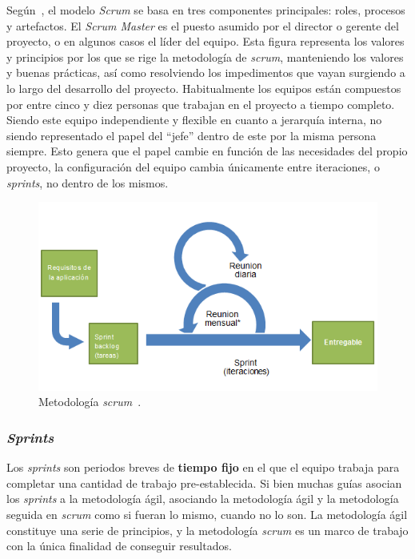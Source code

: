 Según~\cite{cervone2011understanding}, el modelo \textit{Scrum} se basa en tres componentes principales: roles, procesos y artefactos. El \textit{Scrum Master} es el puesto asumido por el director o gerente del proyecto, o en algunos casos el líder del equipo. Esta figura representa los valores y principios por los que se rige la metodología de \textit{scrum}, manteniendo los valores y buenas prácticas, así como resolviendo los impedimentos que vayan surgiendo a lo largo del desarrollo del proyecto. Habitualmente los equipos están compuestos por entre cinco y diez personas que trabajan en el proyecto a tiempo completo. Siendo este equipo independiente y flexible en cuanto a jerarquía interna, no siendo representado el papel del ``jefe'' dentro de este por la misma persona siempre. Esto genera que el papel cambie en función de las necesidades del propio proyecto, la configuración del equipo cambia únicamente entre iteraciones, o \textit{sprints}, no dentro de los mismos.

\begin{figure}[]
	\centering
	\includegraphics[scale=0.5]{../img/anexos/scrum-overview-es}
	\caption{Metodología \textit{scrum}~\cite{SCRUMWIKI}.}\label{img:scrum-overview}
\end{figure}

\subsubsection{\textit{Sprints}}
Los \textit{sprints} son periodos breves de \textbf{tiempo fijo} en el que el equipo trabaja para completar una cantidad de trabajo pre-establecida. Si bien muchas guías asocian los \textit{sprints} a la metodología ágil, asociando la metodología ágil y la metodología seguida en \textit{scrum} como si fueran lo mismo, cuando no lo son. La metodología ágil constituye una serie de principios, y la metodología \textit{scrum} es un marco de trabajo con la única finalidad de conseguir resultados.

